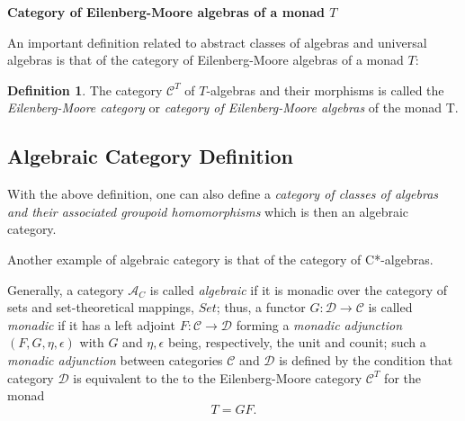 \documentclass[12pt]{article}
\theoremstyle{plain}
\theoremstyle{definition}
\newtheorem{definition}{Definition}[section]
\numberwithin{equation}{section}
\begin{document}
{\bf Category of Eilenberg-Moore algebras of a monad $T$}

An important definition related to abstract classes of algebras and universal algebras is that of the category of Eilenberg-Moore algebras of a monad $T$:

\begin{definition}
The category $\mathcal{C}^T$ of $T$-algebras and their morphisms is called the {\em Eilenberg-Moore category} or {\em category of Eilenberg-Moore algebras} of the monad T.
\end{definition}


\subsection{Algebraic Category Definition}

With the above definition, one can also define a \emph{category of classes of algebras and their
associated groupoid homomorphisms} which is then an algebraic category.

Another example of algebraic category is that of the category of C*-algebras.

Generally, a category $\mathcal{A}_C$ is called \emph{algebraic} if it is monadic over the category of sets and set-theoretical mappings, $Set$; thus, a functor $G: \mathcal{D} \to \mathcal{C}$ is called \emph{monadic} if it has a left adjoint
$F: \mathcal{C}\to \mathcal{D}$ forming a {\em monadic adjunction} $(F,G,\eta,\epsilon)$ with $G$ and $\eta, \epsilon$
being, respectively, the unit and counit; such a {\em monadic adjunction} between categories
$\mathcal{C}$ and $\mathcal{D}$ is defined by the condition that category $\mathcal{D}$ is equivalent to the to the Eilenberg-Moore category $\mathcal{C} ^T$ for the monad
$$T = GF.$$



\end{document}
